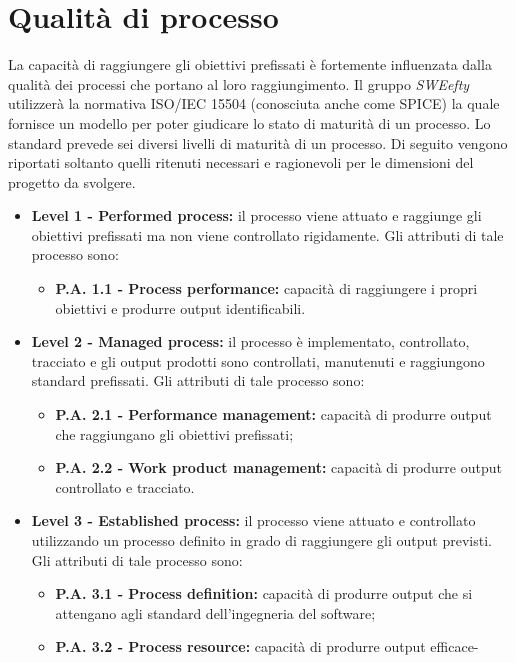 \section{Qualità di processo}
La capacità di raggiungere gli obiettivi prefissati è fortemente influenzata dalla qualità dei processi che portano al loro raggiungimento. Il gruppo \textit{SWEefty} utilizzerà la normativa ISO/IEC 15504 (conosciuta anche come SPICE) la quale fornisce un modello per poter giudicare lo stato di maturità di un processo.
Lo standard prevede sei diversi livelli di maturità di un processo. Di seguito vengono riportati soltanto quelli ritenuti necessari e ragionevoli per le dimensioni del progetto da svolgere.
\begin{itemize} 
	\item \textbf{Level 1 - Performed process:}
		il  processo  viene  attuato  e  raggiunge  gli
		obiettivi prefissati ma non viene controllato rigidamente.  Gli
		attributi di tale processo sono:
		\begin{itemize}
			\item \textbf{P.A. 1.1 - Process performance:}
			capacità  di  raggiungere  i  propri
			obiettivi e produrre output identificabili.
		\end{itemize}
	\item \textbf{Level 2 - Managed process:}
		il processo è implementato, controllato, tracciato e gli output prodotti sono controllati, manutenuti e raggiungono standard prefissati.  Gli attributi di tale processo sono:
		\begin{itemize}
			\item \textbf{P.A. 2.1 - Performance management:}
				capacità  di  produrre  output che raggiungano gli obiettivi prefissati;
			\item \textbf{P.A. 2.2 - Work product management:}
				capacità di produrre output controllato e tracciato.
		\end{itemize}
	\item \textbf{Level 3 - Established process:}
		il processo viene attuato e controllato utilizzando un processo definito in grado di raggiungere gli output previsti. Gli  attributi  di  tale processo sono:
		\begin{itemize}
			\item \textbf{P.A. 3.1 - Process definition:}
			capacità  di  produrre  output  che  si
			attengano agli standard dell’ingegneria del software;
			\item \textbf{P.A. 3.2 - Process resource:}
			capacità  di  produrre  output  efficace-

\end{itemize}
\end{itemize}
